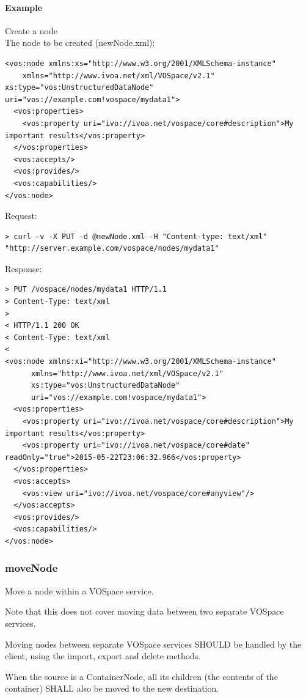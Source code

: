 \documentclass[11pt,a4paper]{ivoa}
\begin{document}
\paragraph{Example}
Create a node
\\[5px]
\noindent
The node to be created (newNode.xml):
\begin{lstlisting}
<vos:node xmlns:xs="http://www.w3.org/2001/XMLSchema-instance"
    xmlns="http://www.ivoa.net/xml/VOSpace/v2.1" xs:type="vos:UnstructuredDataNode" uri="vos://example.com!vospace/mydata1">
  <vos:properties>
    <vos:property uri="ivo://ivoa.net/vospace/core#description">My important results</vos:property>
  </vos:properties>
  <vos:accepts/>
  <vos:provides/>
  <vos:capabilities/>
</vos:node>
\end{lstlisting}
Request:
\begin{lstlisting}
> curl -v -X PUT -d @newNode.xml -H "Content-type: text/xml" "http://server.example.com/vospace/nodes/mydata1"
\end{lstlisting}
Response:
\begin{lstlisting}
> PUT /vospace/nodes/mydata1 HTTP/1.1
> Content-Type: text/xml
>
< HTTP/1.1 200 OK
< Content-Type: text/xml
<
<vos:node xmlns:xi="http://www.w3.org/2001/XMLSchema-instance"
      xmlns="http://www.ivoa.net/xml/VOSpace/v2.1"
      xs:type="vos:UnstructuredDataNode" 
      uri="vos://example.com!vospace/mydata1">
  <vos:properties>
    <vos:property uri="ivo://ivoa.net/vospace/core#description">My important results</vos:property>
    <vos:property uri="ivo://ivoa.net/vospace/core#date" readOnly="true">2015-05-22T23:06:32.966</vos:property>
  </vos:properties>
  <vos:accepts>
    <vos:view uri="ivo://ivoa.net/vospace/core#anyview"/>
  </vos:accepts>
  <vos:provides/>
  <vos:capabilities/>
</vos:node>
\end{lstlisting}

\subsubsection{moveNode}
\label{subsubsec:movenode}
Move a node within a VOSpace service.

Note that this does not cover moving data between two separate VOSpace services.

Moving nodes between separate VOSpace services SHOULD be handled by the client, using the import, export and delete methods.

When the source is a ContainerNode, all its children (the contents of the container) SHALL also be moved to the new destination.
\end{document}
